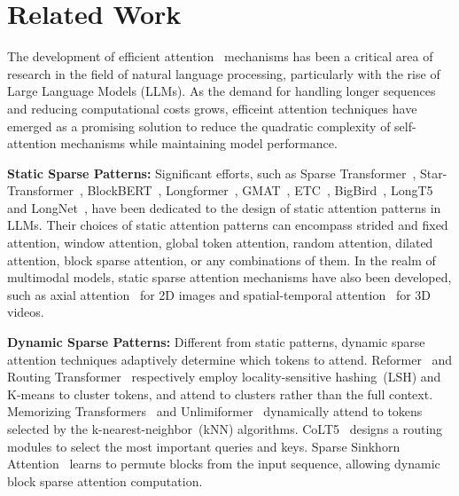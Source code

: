 \section{Related Work}
The development of efficient attention~\citep{tay2020efficient} mechanisms has been a critical area of research in the field of natural language processing, particularly with the rise of Large Language Models (LLMs). As the demand for handling longer sequences and reducing computational costs grows, efficeint attention techniques have emerged as a promising solution to reduce the quadratic complexity of self-attention mechanisms while maintaining model performance.

\textbf{Static Sparse Patterns:}
Significant efforts, such as Sparse Transformer~\citep{child2019generating}, Star-Transformer~\citep{guo2019star}, BlockBERT~\citep{qiu2019blockwise}, Longformer~\citep{beltagy2020longformer},
GMAT~\citep{gupta2020gmat}, ETC~\citep{ainslie2020etc},
BigBird~\citep{zaheer2020big}, LongT5~\citep{guo2021longt5} and LongNet~\citep{ding2023longnet}, have been dedicated to the design of static attention patterns in LLMs. 
Their choices of static attention patterns can encompass strided and fixed attention, window attention, global token attention, random attention, dilated attention, block sparse attention, or any combinations of them. 
In the realm of multimodal models, static sparse attention mechanisms have also been developed, such as axial attention~\citep{ho2019axial} for 2D images and spatial-temporal attention~\citep{opensora} for 3D videos.

\textbf{Dynamic Sparse Patterns:}
Different from static patterns, dynamic sparse attention techniques adaptively determine which tokens to attend. 
Reformer~\citep{kitaev2020reformer} and Routing Transformer~\citep{roy2021efficient} respectively employ locality-sensitive hashing~(LSH) and K-means to cluster tokens, and attend to clusters rather than the full context. Memorizing Transformers~\citep{wu2022memorizing} and Unlimiformer~\citep{bertsch2024unlimiformer} dynamically attend to tokens selected by the k-nearest-neighbor~(kNN) algorithms. 
CoLT5~\citep{ainslie2023colt5} designs a routing modules to select the most important queries and keys.
%
Sparse Sinkhorn Attention~\citep{tay2020sparse} learns to permute blocks from the input sequence, allowing dynamic block sparse attention computation.


